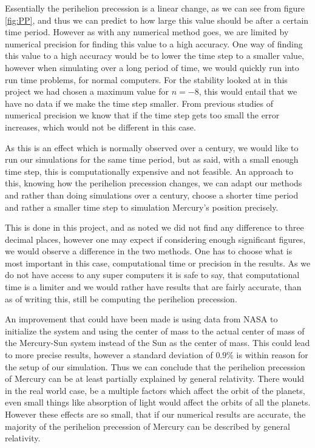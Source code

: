 \documentclass[%
reprint,
nofootinbib,
amsmath,amssymb,
aps,
]{revtex4-1}
\begin{document}
Essentially the perihelion precession is a linear change, as we can see from figure \ref{fig:PP}, and thus we can predict to how large this value should be after a certain time period. However as with any numerical method goes, we are limited by numerical precision for finding this value to a high accuracy. One way of finding this value to a high accuracy would be to lower the time step to a smaller value, however when simulating over a long period of time, we would quickly run into run time problems, for normal computers. For the stability looked at in this project we had chosen a maximum value for $n = -8$, this would entail that we have no data if we make the time step smaller. From previous studies of numerical precision we know that if the time step gets too small the error increases, which would not be different in this case. 

As this is an effect which is normally observed over a century, we would like to run our simulations for the same time period, but as said, with a small enough time step, this is computationally expensive and not feasible. An approach to this, knowing how the perihelion precession changes, we can adapt our methods and rather than doing simulations over a century, choose a shorter time period and rather a smaller time step to simulation Mercury's position precisely. 

This is done in this project, and as noted we did not find any difference to three decimal places, however one may expect if considering enough significant figures, we would observe a difference in the two methods. One has to choose what is most important in this case, computational time or precision in the results. As we do not have access to any super computers it is safe to say, that computational time is a limiter and we would rather have results that are fairly accurate, than as of writing this, still be computing the perihelion precession. 

An improvement that could have been made is using data from NASA to initialize the system and using the center of mass to the actual center of mass of the Mercury-Sun system instead of the Sun as the center of mass. This could lead to more precise results, however a standard deviation of $0.9\%$ is within reason for the setup of our simulation. 
Thus we can conclude that the perihelion precession of Mercury can be at least partially explained by general relativity. There would in the real world case, be a multiple factors which affect the orbit of the planets, even small things like absorption of light would affect the orbits of all the planets. However these effects are so small, that if our numerical results are accurate, the majority of the perihelion precession of Mercury can be described by general relativity. 
\end{document}
